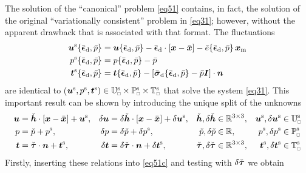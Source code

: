 \documentclass{bmcart}
\newcommand{\eqtref}[1]{\eqref{#1}}
\renewcommand{\dev}{\mathrm{d}}
\newcommand{\rve}{
  {\mathchoice
   {\mbox{\scalebox{0.67}{$\Box$}}}
   {\mbox{\scalebox{0.67}{$\Box$}}}
   {\mbox{\scalebox{0.5}{$\Box$}}}
   {\mbox{\scalebox{0.375}{$\Box$}}}
  }
}
\begin{document}
The solution of the ``canonical'' problem \eqtref{eq51} contains, in fact, the solution of the original ``variationally consistent'' problem in \eqtref{eq31}; however, without the apparent drawback that is associated with that format.
The fluctuations
\begin{subequations}
\begin{align}
    \ta u^\fluct\{\bar{\ts\epsilon}_\dev, \bar{p}\} &= \ta u\{\bar{\ts\epsilon}_\dev, \bar{p}\} - \bar{\ts\epsilon}_\dev \cdot[\ta x - \bar{\ta x}] - \bar{e}\{\bar{\ts\epsilon}_\dev, \bar{p}\}\,\ta x_\mean
\label{eq52a} \\
    p^\fluct\{\bar{\ts\epsilon}_\dev, \bar{p}\} &= p\{\bar{\ts\epsilon}_\dev, \bar{p}\} - \bar{p}
\label{eq52b} \\
    \ta t^\fluct\{\bar{\ts\epsilon}_\dev, \bar{p}\} &= \ta t\{\bar{\ts\epsilon}_\dev, \bar{p}\} - [\bar{\ts\sigma}_\dev\{\bar{\ts\epsilon}_\dev, \bar{p}\} - \bar{p}\ts I]\cdot \ta n
\label{eq52c}
\end{align}
\end{subequations}
are identical to ($\ta{u}^\fluct,p^\fluct,\ta{t}^\fluct)\in\set{U}_\rve^\fluct\times\set{P}_\rve^\fluct\times\set{T}_\rve^\fluct$ that solve the system \eqtref{eq31}.
This important result can be shown by introducing the unique split of the unknowns
\begin{align}
 \ta u &= \check{\ts h}\cdot[\ta x - \bar{\ta x}] + \ta u^\fluct, & \delta\ta u &= \delta\check{\ts h}\cdot[\ta x - \bar{\ta x}] + \delta\ta u^\fluct,
 & \check{\ts h}, \delta\check{\ts h} &\in \set{R}^{3\times 3}, & \ta u^\fluct, \delta\ta u^\fluct &\in \set{U}_\rve^\fluct
\\
 p &= \check{p} + p^\fluct, & \delta p &= \delta\check{p} + \delta p^\fluct,
 & \check{p}, \delta\check{p} &\in \set{R},
 & p^\fluct, \delta p^\fluct &\in \set{P}_\rve^\fluct
\\
 \ta t &= \check{\ts \tau}\cdot\ta n + \ta t^\fluct, & \delta\ta t &= \delta\check{\ts \tau}\cdot\ta n + \delta\ta t^\fluct,
 & \check{\ts\tau}, \delta\check{\ts\tau} &\in \set{R}^{3\times 3}, & \ta t^\fluct, \delta\ta t^\fluct &\in \set{T}_\rve^\fluct
\end{align}
Firstly, inserting these relations into \eqtref{eq51c} and testing with $\delta\check{\boldsymbol{\tau}}$ we obtain
\end{document}
